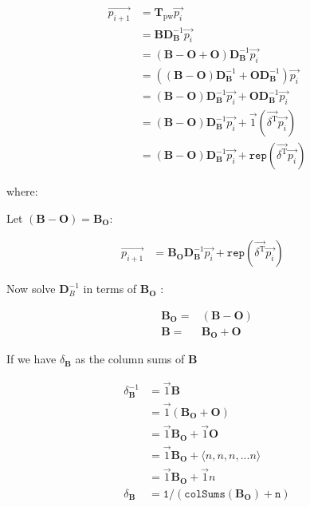 \documentclass[11pt]{report}
\begin{document}
\begin{align}
  \overrightarrow{p_{i + 1}} & = \mathbf{T}_{\mathrm{pw}}
  \overrightarrow{p_i}\\
& = \mathbf{BD}_{\mathbf{B}}^{- 1}
  \overrightarrow{p_i}\\
  & = \left( \mathbf{B} - \mathbf{O} + \mathbf{O} \right)
  \mathbf{D}_{\mathbf{B}}^{- 1} \overrightarrow{p_i}\\
  & = \left( \left( \mathbf{B} - \mathbf{O} \right)
  \mathbf{D}_{\mathbf{B}}^{- 1} + \mathbf{OD}_{\mathbf{B}}^{- 1} \right)
  \overrightarrow{p_i}\\
  & = \left( \mathbf{B} - \mathbf{O} \right) \mathbf{D}_{\mathbf{B}}^{- 1}
  \overrightarrow{p_i} + \mathbf{OD}_{\mathbf{B}}^{- 1} \overrightarrow{p_i}\\
  & = \left( \mathbf{B} - \mathbf{O} \right) \mathbf{D}_{\mathbf{B}}^{- 1}
  \overrightarrow{p_i} + \vec{1} (\overrightarrow{\delta^{\mathrm{T}}}
  \overrightarrow{p_i}) \\
  & = \left( \mathbf{B} - \mathbf{O} \right) \mathbf{D}_{\mathbf{B}}^{- 1}
  \overrightarrow{p_i} + \mathtt{rep} (\overrightarrow{\delta^{\mathrm{T}}}
  \overrightarrow{p_i})
\end{align}

where:


Let \((\mathbf{B}-\mathbf{O}) = \mathbf{B_{\mathbf{O}}}\):

\begin{eqnarray*}
  \overrightarrow{p_{i + 1}} & = \mathbf{B_{\mathbf{O}}} \mathbf{D}_{\mathbf{B}}^{- 1}
  \overrightarrow{p_i} + \mathtt{rep} (\overrightarrow{\delta^{\mathrm{T}}}
  \overrightarrow{p_i}) &
\end{eqnarray*}

Now solve \(\mathbf{D}_B^{- 1}\) in terms of \(\mathbf{B_{O}}\) :

\begin{align}
  \mathbf{B}_{\mathbf{\mathbf{O}}} = & (\mathbf{B}-\mathbf{O})\\
  \mathbf{B} = & \mathbf{B}_{\mathbf{\mathbf{O}}}
  +\mathbf{O}
\end{align}

If we have \(\delta_{\mathbf{B}}\) as the column sums of \(\mathbf{B}\)


\begin{align}
\delta^{-1}_{\mathbf{B}} &= \vec{1}\mathbf{B} \\
&= \vec{1} \left( \mathbf{B_{O}} + \mathbf{O}\right) \\
&= \vec{1}  \mathbf{B_{O}} + \vec{1}\mathbf{O} \\
&= \vec{1} \mathbf{B_{\mathbf{O}}} + \langle n, n, n, ... n \rangle \\
&= \vec{1} \mathbf{B_{\mathbf{O}}} + \vec{1} n \\
\delta_{\mathbf{B}}&=\mathtt{1/(colSums(\mathbf{B_{O}}) + n )}
\end{align}
\end{document}
